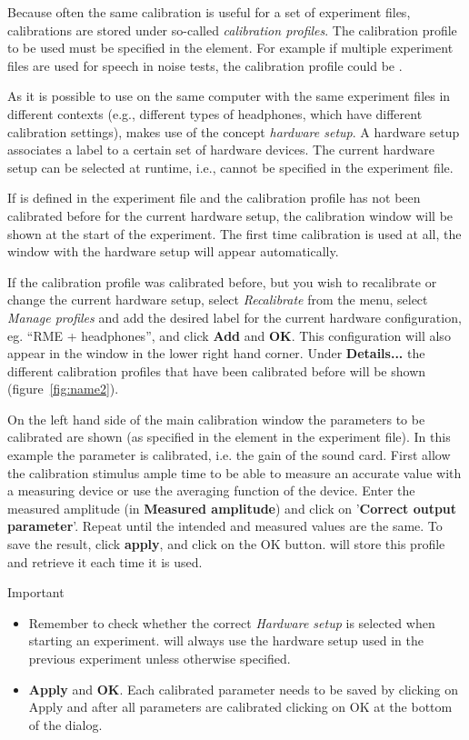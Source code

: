 Because often the same calibration is useful for a set of
experiment files, calibrations are stored under so-called
\emph{calibration profiles}. The calibration profile to be used
must be specified in the  element. For
example if multiple experiment files are used for speech in noise
tests, the calibration profile could be .

As it is possible to use \apex on the same computer with the same
experiment files in different contexts (e.g., different types of
headphones, which have different calibration settings), \apex
makes use of the concept \emph{hardware setup}. A hardware setup
associates a label to a certain set of hardware devices. The
current hardware setup can be selected at runtime, i.e., cannot be
specified in the experiment file.

If  is defined in the experiment file and the
calibration profile has not been calibrated before for the current
hardware setup, the calibration window will be shown at the start
of the experiment. The first time calibration is used at all, the
window with the hardware setup will appear automatically.


If the calibration profile was calibrated before, but you wish to
recalibrate or change the current hardware setup, select
\emph{Recalibrate} from the menu, select \emph{Manage profiles}
and add the desired label for the current hardware configuration,
eg. ``RME + headphones'', and click \textbf{Add} and \textbf{OK}.
This configuration will also appear in the \apex window in the
lower right hand corner. Under \textbf{Details...} the different
calibration profiles that have been calibrated before will be
shown (figure~\ref{fig:name2}).

On the left hand side of the main calibration window the
parameters to be calibrated are shown (as specified in the
 element in the experiment file). In this
example the parameter  is calibrated, i.e. the gain
of the sound card. First allow the calibration stimulus ample time
to be able to measure an accurate value with a measuring device or
use the averaging function of the device. Enter the measured
amplitude (in \textbf{Measured amplitude}) and click on
'\textbf{Correct output parameter}'. Repeat until the intended and
measured values are the same. To save the result, click
\textbf{apply}, and click on the OK button.  \apex will store this
profile and retrieve it each time it is used.


Important
\begin{itemize}

\item Remember to check whether the correct \emph{Hardware setup}
is selected when starting an experiment. \apex will always use the
hardware setup used in the previous experiment unless otherwise
specified.

\item \textbf{Apply} and \textbf{OK}. Each calibrated parameter
needs to be saved by clicking on Apply and after all parameters
are calibrated clicking on OK at the bottom of the dialog.
\end{itemize}

